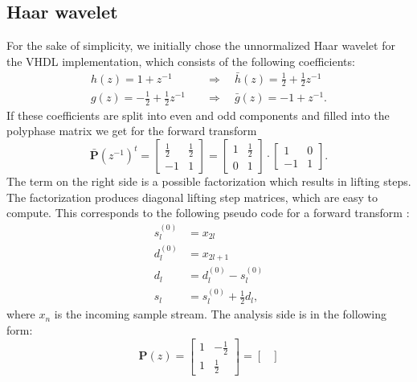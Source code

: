 \begin{refsection}
\subsection{Haar wavelet}
\label{fpga:sec:haar}
%

For the sake of simplicity, we initially chose the unnormalized Haar wavelet for the VHDL implementation, which consists of the following coefficients:
\begin{align}
	h(z) = 1 + z^{-1} \quad & \Rightarrow \quad \bar h(z) = \frac{1}{2} + \frac{1}{2} z^{-1}
	\\
	g(z) = - \frac{1}{2} + \frac{1}{2} z^{-1} \quad & \Rightarrow \quad \bar g(z) = -1 + z^{-1}.
\end{align}
If these coefficients are split into even and odd components and filled into the polyphase matrix we get for the forward transform
\begin{equation*}
	\bm {\bar P}(z^{-1})^t =
	\begin{bmatrix}
		\frac{1}{2} & \frac{1}{2} \\
		-1 & 1
	\end{bmatrix}
	= 
	\begin{bmatrix}
		1 & \frac{1}{2} \\
		0 & 1
	\end{bmatrix}
	\cdot
	\begin{bmatrix}
		1 & 0 \\
		-1 & 1
	\end{bmatrix}
	.
\end{equation*}
The term on the right side is a possible factorization which results in lifting steps.
The factorization produces diagonal lifting step matrices, which are easy to compute.
This corresponds to the following pseudo code for a forward transform \cite{fpga:Daubechies1998}:
\begin{align}\label{fpga:equation:haar}
	s_l^{(0)} &= x_{2l} \\
	d_l^{(0)} &= x_{2l+1} \\ 
	d_l &= d_l^{(0)} - s_l^{(0)} \\
	s_l &= s_l^{(0)} + \frac{1}{2}d_l
	,
\end{align}
where $x_{n}$ is the incoming sample stream.
The analysis side is in the following form:
\begin{equation*}
	\bm P(z) =
	\begin{bmatrix}
		1 & -\frac{1}{2} \\
		1 & \frac{1}{2}
	\end{bmatrix}
	= 
	\begin{bmatrix}

\end{bmatrix}
\end{equation*}
\end{refsection}
